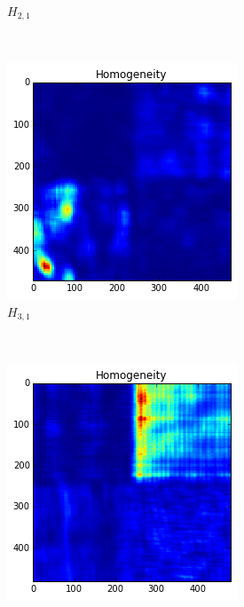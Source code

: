 \documentclass[a4paper]{article}
\begin{document}
\begin{figure}
\begin{subfigure}[b]{0.30\textwidth}
        \caption{%
            $H_{2,1}$
        }
        \label{fig:h21}
    \end{subfigure}
    ~
    \begin{subfigure}[b]{0.30\textwidth}
        \centering
        \includegraphics[width=\textwidth]{hom31.png}
        \caption{%
            $H_{3,1}$
        }
        \label{fig:h31}
    \end{subfigure}
    \\
    \begin{subfigure}[b]{0.30\textwidth}
        \centering
        \includegraphics[width=\textwidth]{hom12.png}

\end{subfigure}
\end{figure}
\end{document}
